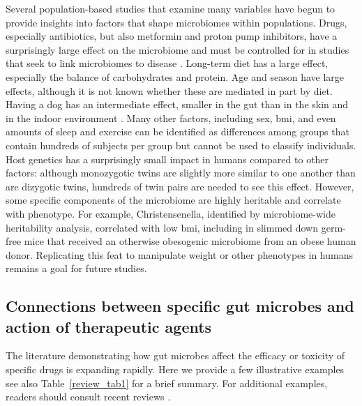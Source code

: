 Several population-based studies that examine many variables have begun to provide insights into factors that shape microbiomes within populations. Drugs, especially antibiotics, but also metformin and proton pump inhibitors, have a surprisingly large effect on the microbiome and must be controlled for in studies that seek to link microbiomes to disease \cite{RN4080}. Long-term diet has a large effect, especially the balance of carbohydrates and protein. Age and season have large effects, although it is not known whether these are mediated in part by diet. Having a dog has an intermediate effect, smaller in the gut than in the skin and in the indoor environment \cite{RN4083, RN4082}. Many other factors, including sex, \gls{bmi}, and even amounts of sleep and exercise can be identified as differences among groups that contain hundreds of subjects per group but cannot be used to classify individuals. Host genetics has a surprisingly small impact in humans compared to other factors: although monozygotic twins are slightly more similar to one another than are dizygotic twins, hundreds of twin pairs are needed to see this effect. However, some specific components of the microbiome are highly heritable and correlate with phenotype. For example, Christensenella, identified by microbiome-wide heritability analysis, correlated with low \gls{bmi}, including in slimmed down germ-free mice that received an otherwise obesogenic microbiome from an obese human donor. Replicating this feat to manipulate weight or other phenotypes in humans remains a goal for future studies.

\subsection{Connections between specific gut microbes and action of therapeutic agents}
  
The literature demonstrating how gut microbes affect the efficacy or toxicity of specific drugs is expanding rapidly. Here we provide a few illustrative examples see also Table~\ref{review_tab1} for a brief summary. For additional examples, readers should  consult recent reviews \cite{RN4084,RN4086}.

